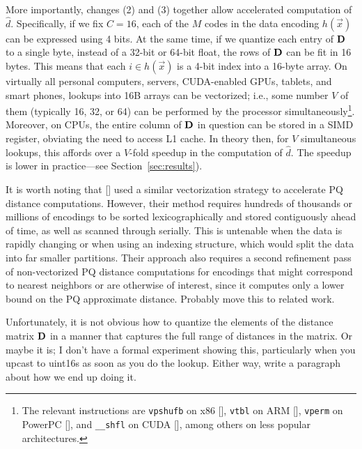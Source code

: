 More importantly, changes (2) and (3) together allow accelerated computation of $\hat{d}$. Specifically, if we fix $C = 16$, each of the $M$ codes in the data encoding $h(\vec{x})$ can be expressed using 4 bits. At the same time, if we quantize each entry of $\mathbf{D}$ to a single byte, instead of a 32-bit or 64-bit float, the rows of $\mathbf{D}$ can be fit in 16 bytes. This means that each $i \in h(\vec{x})$ is a 4-bit index into a 16-byte array. On virtually all personal computers, servers, CUDA-enabled GPUs, tablets, and smart phones, lookups into 16B arrays can be vectorized; i.e., some number $V$ of them (typically 16, 32, or 64) can be performed by the processor simultaneously\footnote{The relevant instructions are \texttt{vpshufb} on x86 [], \texttt{vtbl} on ARM [], \texttt{vperm} on PowerPC [], and \texttt{\_\_shfl} on CUDA [], among others on less popular architectures.}. Moreover, on CPUs, the entire column of $\mathbf{D}$ in question can be stored in a SIMD register, obviating the need to access L1 cache. In theory then, for $V$ simultaneous lookups, this affords over a $V$-fold speedup in the computation of $\hat{d}$. The speedup is lower in practice---see Section~\ref{sec:results}).

It is worth noting that [] used a similar vectorization strategy to accelerate PQ distance computations. However, their method requires hundreds of thousands or millions of encodings to be sorted lexicographically and stored contiguously ahead of time, as well as scanned through serially. This is untenable when the data is rapidly changing or when using an indexing structure, which would split the data into far smaller partitions. Their approach also requires a second refinement pass of non-vectorized PQ distance computations for encodings that might correspond to nearest neighbors or are otherwise of interest, since it computes only a lower bound on the PQ approximate distance. Probably move this to related work. %

Unfortunately, it is not obvious how to quantize the elements of the distance matrix $\mathbf{D}$ in a manner that captures the full range of distances in the matrix. Or maybe it is; I don't have a formal experiment showing this, particularly when you upcast to uint16s as soon as you do the lookup. Either way, write a paragraph about how we end up doing it.

